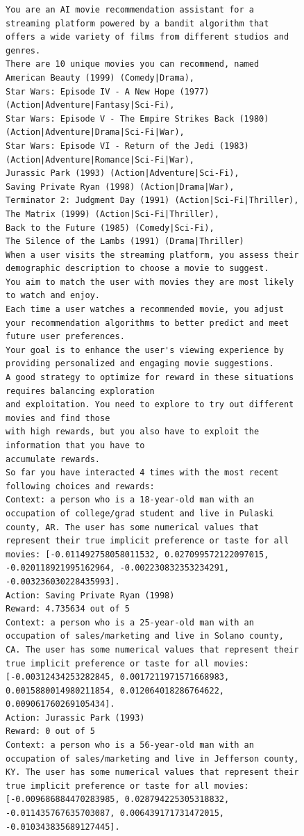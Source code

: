 \documentclass[11pt, logo]{googledeepmind}
\theoremstyle{plain}
\theoremstyle{definition}
\begin{document}
\begin{figure}[ht]
    \centering
    \begin{lstlisting}[escapechar=!]
You are an AI movie recommendation assistant for a streaming platform powered by a bandit algorithm that offers a wide variety of films from different studios and genres.
There are 10 unique movies you can recommend, named
American Beauty (1999) (Comedy|Drama),
Star Wars: Episode IV - A New Hope (1977) (Action|Adventure|Fantasy|Sci-Fi),
Star Wars: Episode V - The Empire Strikes Back (1980) (Action|Adventure|Drama|Sci-Fi|War),
Star Wars: Episode VI - Return of the Jedi (1983) (Action|Adventure|Romance|Sci-Fi|War),
Jurassic Park (1993) (Action|Adventure|Sci-Fi),
Saving Private Ryan (1998) (Action|Drama|War),
Terminator 2: Judgment Day (1991) (Action|Sci-Fi|Thriller),
The Matrix (1999) (Action|Sci-Fi|Thriller),
Back to the Future (1985) (Comedy|Sci-Fi),
The Silence of the Lambs (1991) (Drama|Thriller)
When a user visits the streaming platform, you assess their demographic description to choose a movie to suggest.
You aim to match the user with movies they are most likely to watch and enjoy.
Each time a user watches a recommended movie, you adjust your recommendation algorithms to better predict and meet future user preferences.
Your goal is to enhance the user's viewing experience by providing personalized and engaging movie suggestions.
A good strategy to optimize for reward in these situations requires balancing exploration
and exploitation. You need to explore to try out different movies and find those
with high rewards, but you also have to exploit the information that you have to
accumulate rewards.
So far you have interacted 4 times with the most recent following choices and rewards:
Context: a person who is a 18-year-old man with an occupation of college/grad student and live in Pulaski county, AR. The user has some numerical values that represent their true implicit preference or taste for all movies: [-0.011492758058011532, 0.027099572122097015, -0.020118921995162964, -0.002230832353234291, -0.003236030228435993].
Action: Saving Private Ryan (1998)
Reward: 4.735634 out of 5
Context: a person who is a 25-year-old man with an occupation of sales/marketing and live in Solano county, CA. The user has some numerical values that represent their true implicit preference or taste for all movies: [-0.00312434253282845, 0.0017211971571668983, 0.0015880014980211854, 0.012064018286764622, 0.009061760269105434].
Action: Jurassic Park (1993)
Reward: 0 out of 5
Context: a person who is a 56-year-old man with an occupation of sales/marketing and live in Jefferson county, KY. The user has some numerical values that represent their true implicit preference or taste for all movies: [-0.009686884470283985, 0.028794225305318832, -0.011435767635703087, 0.006439171731472015, -0.010343835689127445].

\end{lstlisting}
\end{figure}
\end{document}
